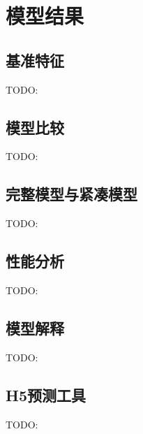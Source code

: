 \section{模型结果}

\subsection{基准特征}

TODO:

\subsection{模型比较}

TODO:

\subsection{完整模型与紧凑模型}

TODO:

\subsection{性能分析}

TODO:

\subsection{模型解释}

TODO:

\subsection{H5预测工具}

TODO:
